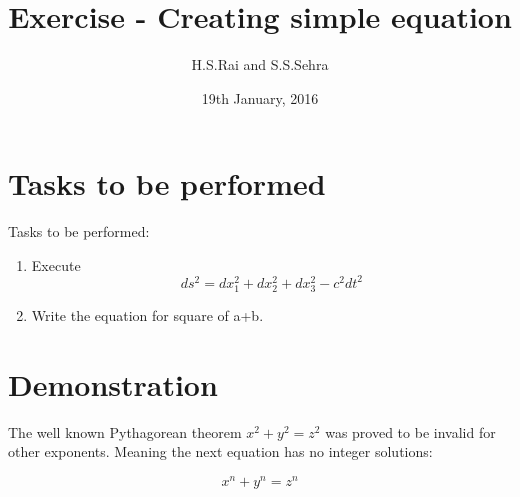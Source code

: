 \documentclass{article}
\title{Exercise - Creating simple equation}
\author{H.S.Rai and S.S.Sehra}
\date{19th January, 2016}
\begin{document}
	\maketitle
	
	\section*{Tasks to be performed}
	Tasks to be performed:
	\begin{enumerate}
		\item Execute \[ ds^2 = dx_1^2 + dx_2^2 + dx_3^2 - c^2 dt^2 \]
		\item Write the equation for square of a+b.
	\end{enumerate}
	\section*{Demonstration}
	
The well known Pythagorean theorem \(x^2 + y^2 = z^2\) was 
proved to be invalid for other exponents. 
Meaning the next equation has no integer solutions:

\[ x^n + y^n = z^n \]
\end{document}
